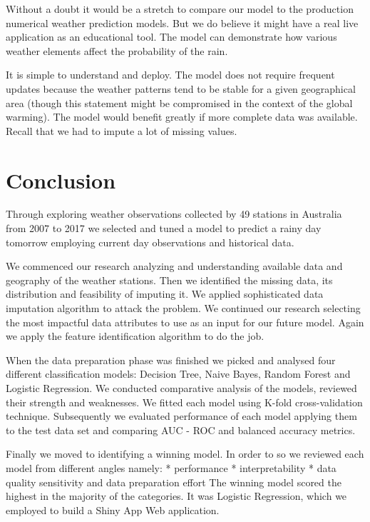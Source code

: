 Without a doubt it would be a stretch to compare our model to the
production numerical weather prediction models. But we do believe it
might have a real live application as an educational tool. The model can
demonstrate how various weather elements affect the probability of the
rain.

It is simple to understand and deploy. The model does not require
frequent updates because the weather patterns tend to be stable for a
given geographical area (though this statement might be compromised in
the context of the global warming). The model would benefit greatly if
more complete data was available. Recall that we had to impute a lot of
missing values.

\hypertarget{conclusion}{%
\section{Conclusion}\label{conclusion}}

Through exploring weather observations collected by 49 stations in
Australia from 2007 to 2017 we selected and tuned a model to predict a
rainy day tomorrow employing current day observations and historical
data.

We commenced our research analyzing and understanding available data and
geography of the weather stations. Then we identified the missing data,
its distribution and feasibility of imputing it. We applied
sophisticated data imputation algorithm to attack the problem. We
continued our research selecting the most impactful data attributes to
use as an input for our future model. Again we apply the feature
identification algorithm to do the job.

When the data preparation phase was finished we picked and analysed four
different classification models: Decision Tree, Naive Bayes, Random
Forest and Logistic Regression. We conducted comparative analysis of the
models, reviewed their strength and weaknesses. We fitted each model
using K-fold cross-validation technique. Subsequently we evaluated
performance of each model applying them to the test data set and
comparing AUC - ROC and balanced accuracy metrics.

Finally we moved to identifying a winning model. In order to so we
reviewed each model from different angles namely: * performance *
interpretability * data quality sensitivity and data preparation effort
The winning model scored the highest in the majority of the categories.
It was Logistic Regression, which we employed to build a Shiny App Web
application.

